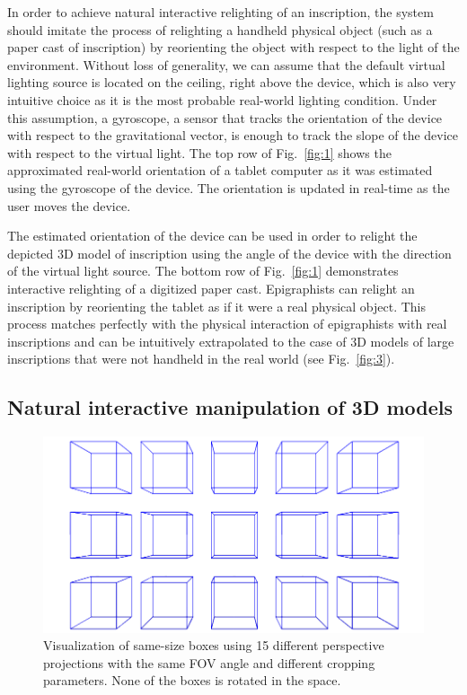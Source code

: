 \documentclass[amsthm,ebook]{saparticle}
\begin{document}
\noindent In order to achieve natural interactive relighting of an inscription, the system should imitate the process of
relighting a handheld physical object (such as a paper cast of inscription) by reorienting the object with respect to
the light of the environment. Without loss of generality, we can assume that the default virtual lighting source is
located on the ceiling, right above the device, which is also very intuitive choice as it is the most probable
real-world lighting condition. Under this assumption, a gyroscope, a sensor that tracks the orientation of the device
with respect to the gravitational vector, is enough to track the slope of the device with respect to the virtual light.
The top row of Fig.~\ref{fig:1} shows the approximated real-world orientation of a tablet computer as it was estimated using
the gyroscope of the device. The orientation is updated in real-time as the user moves the device.

 

The estimated orientation of the device can be used in order to relight the depicted 3D model of inscription using the
angle of the device with the direction of the virtual light source. The bottom row of Fig.~\ref{fig:1} demonstrates interactive
relighting of a digitized paper cast. Epigraphists can relight an inscription by reorienting the tablet as if it were a
real physical object. This process matches perfectly with the physical interaction of epigraphists with real
inscriptions and can be intuitively extrapolated to the case of 3D models of large inscriptions that were not handheld
in the real world (see Fig.~\ref{fig:3}).




\subsection{Natural interactive manipulation of 3D models }


\begin{figure}[!hbp]
\centering
 \includegraphics[width=\columnwidth]{EAGLE2016cameraready-img003.png}
\caption{Visualization of same-size boxes using 15 different perspective projections with the same FOV angle and
different cropping parameters. None of the boxes is rotated in the space. }
\label{fig:2}
\end{figure}
\end{document}
